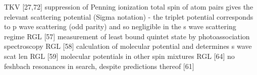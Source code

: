 	TKV [27,72] suppression of Penning ionization 
	total spin of atom pairs gives the relevant scattering potential (Sigma notation) - the triplet potential corresponds to p wave scattering (odd parity) and so negligible in the s wave scattering regime
	RGL [57] measurement of least bound quintet state by photoassociation spectroscopy 
	RGL [58] calculation of molecular potential and determines s wave scat len 
	RGL [59] molecular potentials in other spin mixtures 
	RGL [64] no feshbach resonances in search, despite predictions thereof [61] 

